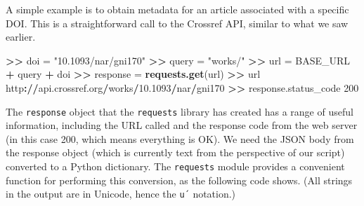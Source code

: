 \documentclass[]{krantz}
\newenvironment{Shaded}{\begin{snugshade}}{\end{snugshade}}
\newcommand{\KeywordTok}[1]{\textcolor[rgb]{0.13,0.29,0.53}{\textbf{#1}}}
\newcommand{\DecValTok}[1]{\textcolor[rgb]{0.00,0.00,0.81}{#1}}
\newcommand{\FloatTok}[1]{\textcolor[rgb]{0.00,0.00,0.81}{#1}}
\newcommand{\StringTok}[1]{\textcolor[rgb]{0.31,0.60,0.02}{#1}}
\newcommand{\OperatorTok}[1]{\textcolor[rgb]{0.81,0.36,0.00}{\textbf{#1}}}
\newcommand{\ErrorTok}[1]{\textcolor[rgb]{0.64,0.00,0.00}{\textbf{#1}}}
\newcommand{\NormalTok}[1]{#1}
\begin{document}
A simple example is to obtain metadata for an article associated with a
specific DOI. This is a straightforward call to the Crossref API,
similar to what we saw earlier.

\begin{Shaded}
\begin{Highlighting}[]
\OperatorTok{>}\ErrorTok{>}\StringTok{ }\NormalTok{doi =}\StringTok{ "10.1093/nar/gni170"}
\OperatorTok{>}\ErrorTok{>}\StringTok{ }\NormalTok{query =}\StringTok{ "works/"}
\OperatorTok{>}\ErrorTok{>}\StringTok{ }\NormalTok{url =}\StringTok{ }\NormalTok{BASE_URL }\OperatorTok{+}\StringTok{ }\NormalTok{query }\OperatorTok{+}\StringTok{ }\NormalTok{doi}
\OperatorTok{>}\ErrorTok{>}\StringTok{ }\NormalTok{response =}\StringTok{ }\KeywordTok{requests.get}\NormalTok{(url)}
\OperatorTok{>}\ErrorTok{>}\StringTok{ }\NormalTok{url}
\NormalTok{http}\OperatorTok{:}\ErrorTok{//}\NormalTok{api.crossref.org}\OperatorTok{/}\NormalTok{works}\OperatorTok{/}\FloatTok{10.1093}\OperatorTok{/}\NormalTok{nar}\OperatorTok{/}\NormalTok{gni170}
\OperatorTok{>}\ErrorTok{>}\StringTok{ }\NormalTok{response.status_code}
\DecValTok{200}
\end{Highlighting}
\end{Shaded}

The \texttt{response} object that the \texttt{requests} library has
created has a range of useful information, including the URL called and
the response code from the web server (in this case 200, which means
everything is OK). We need the JSON body from the response object (which
is currently text from the perspective of our script) converted to a
Python dictionary. The \texttt{requests} module provides a convenient
function for performing this conversion, as the following code shows.
(All strings in the output are in Unicode, hence the \texttt{u´}
notation.)
\end{document}
